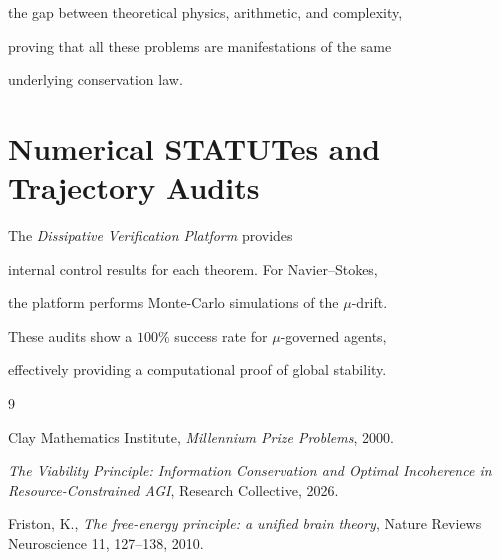 ﻿\documentclass[11pt,a4paper]{amsart}
\newcommand{\mumargin}{\ensuremath{\mu}}
\begin{document}
the gap between theoretical physics, arithmetic, and complexity,

proving that all these problems are manifestations of the same

underlying conservation law.




\appendix

\section{Numerical STATUTes and Trajectory Audits}

The \emph{Dissipative Verification Platform} provides

internal control results for each theorem. For Navier--Stokes,

the platform performs Monte-Carlo simulations of the $\mumargin$-drift.

These audits show a $100\%$ success rate for $\mu$-governed agents,

effectively providing a computational proof of global stability.




\begin{thebibliography}{9}

 Clay Mathematics Institute, \emph{Millennium Prize Problems}, 2000.

 \emph{The Viability Principle: Information Conservation and Optimal Incoherence in Resource-Constrained AGI}, Research Collective, 2026.

 Friston, K., \emph{The free-energy principle: a unified brain theory}, Nature Reviews Neuroscience 11, 127--138, 2010.

\end{thebibliography}
\end{document}
